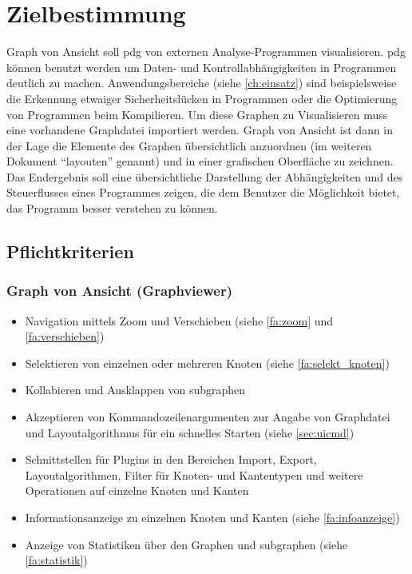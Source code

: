 \chapter{Zielbestimmung}
Graph von Ansicht soll \gls{pdg} von externen Analyse-Programmen visualisieren.
\gls{pdg} können benutzt werden um Daten- und Kontrollabhängigkeiten in Programmen deutlich zu machen.
Anwendungsbereiche (siehe \ref{ch:einsatz}) sind beispielsweise die Erkennung etwaiger Sicherheitslücken in Programmen oder die Optimierung von Programmen beim Kompilieren.
Um diese Graphen zu Visualisieren muss eine vorhandene Graphdatei importiert werden.
Graph von Ansicht ist dann in der Lage die Elemente des Graphen übersichtlich anzuordnen (im weiteren Dokument ``layouten'' genannt) und in einer grafischen Oberfläche zu zeichnen.
Das Endergebnis soll eine übersichtliche Darstellung der Abhängigkeiten und des Steuerflusses eines Programmes zeigen, die dem Benutzer die Möglichkeit bietet, das Programm besser verstehen zu können.\\


\section{Pflichtkriterien}

\subsection{Graph von Ansicht (Graphviewer)}
  \begin{itemize}
    \item Navigation mittels Zoom und Verschieben (siehe \ref{fa:zoom} und \ref{fa:verschieben})
    \item Selektieren von einzelnen oder mehreren Knoten (siehe \ref{fa:selekt_knoten})
    \item Kollabieren und Ausklappen von \gls{subgraph}en %
    \item Akzeptieren von Kommandozeilenargumenten zur Angabe von Graphdatei und Layoutalgorithmus für ein schnelles Starten (siehe \ref{sec:uicmd})
    \item Schnittstellen für Plugins in den Bereichen Import, Export, Layoutalgorithmen, Filter für Knoten- und Kantentypen und weitere Operationen auf einzelne Knoten und Kanten
    \item Informationsanzeige zu einzelnen Knoten und Kanten (siehe \ref{fa:infoanzeige})
    \item Anzeige von Statistiken über den Graphen und \gls{subgraph}en (siehe \ref{fa:statistik})
  \end{itemize}
  
